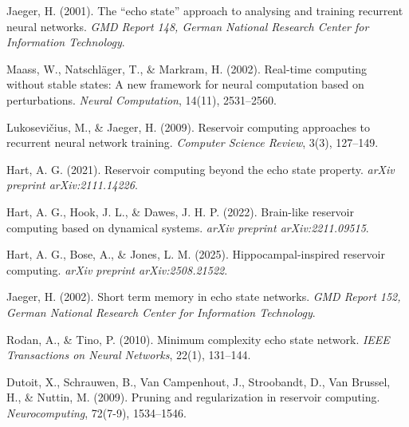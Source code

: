 \documentclass[11pt,a4paper]{article}
\begin{document}

\begin{thebibliography}{9}

Jaeger, H. (2001).
\newblock The ``echo state'' approach to analysing and training recurrent neural networks.
\newblock \emph{GMD Report 148, German National Research Center for Information Technology}.

Maass, W., Natschl\"ager, T., \& Markram, H. (2002).
\newblock Real-time computing without stable states: A new framework for neural computation based on perturbations.
\newblock \emph{Neural Computation}, 14(11), 2531--2560.

Lukosevi\v{c}ius, M., \& Jaeger, H. (2009).
\newblock Reservoir computing approaches to recurrent neural network training.
\newblock \emph{Computer Science Review}, 3(3), 127--149.

Hart, A. G. (2021).
\newblock Reservoir computing beyond the echo state property.
\newblock \emph{arXiv preprint arXiv:2111.14226}.

Hart, A. G., Hook, J. L., \& Dawes, J. H. P. (2022).
\newblock Brain-like reservoir computing based on dynamical systems.
\newblock \emph{arXiv preprint arXiv:2211.09515}.

Hart, A. G., Bose, A., \& Jones, L. M. (2025).
\newblock Hippocampal-inspired reservoir computing.
\newblock \emph{arXiv preprint arXiv:2508.21522}.

Jaeger, H. (2002).
\newblock Short term memory in echo state networks.
\newblock \emph{GMD Report 152, German National Research Center for Information Technology}.

Rodan, A., \& Tino, P. (2010).
\newblock Minimum complexity echo state network.
\newblock \emph{IEEE Transactions on Neural Networks}, 22(1), 131--144.

Dutoit, X., Schrauwen, B., Van Campenhout, J., Stroobandt, D., Van Brussel, H., \& Nuttin, M. (2009).
\newblock Pruning and regularization in reservoir computing.
\newblock \emph{Neurocomputing}, 72(7-9), 1534--1546.

\end{thebibliography}
\end{document}
